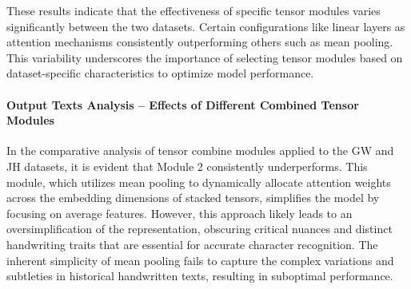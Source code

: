 These results indicate that the effectiveness of specific tensor modules varies significantly between the two datasets. Certain configurations like linear layers as attention mechanisms consistently outperforming others such as mean pooling. This variability underscores the importance of selecting tensor modules based on dataset-specific characteristics to optimize model performance. 


\paragraph*{Output Texts Analysis -- Effects of Different Combined Tensor Modules}
In the comparative analysis of tensor combine modules applied to the GW and JH datasets, it is evident that Module 2 consistently underperforms. This module, which utilizes mean pooling to dynamically allocate attention weights across the embedding dimensions of stacked tensors, simplifies the model by focusing on average features. However, this approach likely leads to an oversimplification of the representation, obscuring critical nuances and distinct handwriting traits that are essential for accurate character recognition. The inherent simplicity of mean pooling fails to capture the complex variations and subtleties in historical handwritten texts, resulting in suboptimal performance.


